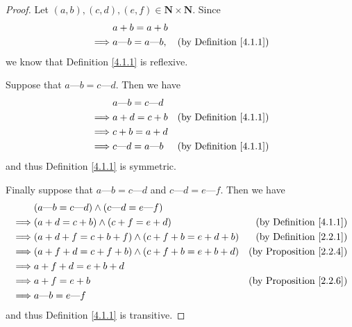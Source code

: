 \begin{proof}
    Let \((a, b), (c, d), (e, f) \in \mathbf{N} \times \mathbf{N}\).
    Since
    \begin{align*}
                 & a + b = a + b                                                         \\
        \implies & a \text{---} b = a \text{---} b, & \text{(by Definition \ref{4.1.1})}
    \end{align*}
    we know that Definition \ref{4.1.1} is reflexive.

    Suppose that \(a \text{---} b = c \text{---} d\).
    Then we have
    \begin{align*}
                 & a \text{---} b = c \text{---} d                                      \\
        \implies & a + d = c + b                   & \text{(by Definition \ref{4.1.1})} \\
        \implies & c + b = a + d                                                        \\
        \implies & c \text{---} d = a \text{---} b & \text{(by Definition \ref{4.1.1})}
    \end{align*}
    and thus Definition \ref{4.1.1} is symmetric.

    Finally suppose that \(a \text{---} b = c \text{---} d\) and \(c \text{---} d = e \text{---} f\).
    Then we have
    \begin{align*}
                 & (a \text{---} b = c \text{---} d) \land (c \text{---} d = e \text{---} f)                                       \\
        \implies & (a + d = c + b) \land (c + f = e + d)                                     & \text{(by Definition \ref{4.1.1})}  \\
        \implies & (a + d + f = c + b + f) \land (c + f + b = e + d + b)                     & \text{(by Definition \ref{2.2.1})}  \\
        \implies & (a + f + d = c + f + b) \land (c + f + b = e + b + d)                     & \text{(by Proposition \ref{2.2.4})} \\
        \implies & a + f + d = e + b + d                                                                                           \\
        \implies & a + f = e + b                                                             & \text{(by Proposition \ref{2.2.6})} \\
        \implies & a \text{---} b = e \text{---} f
    \end{align*}
    and thus Definition \ref{4.1.1} is transitive.
\end{proof}

